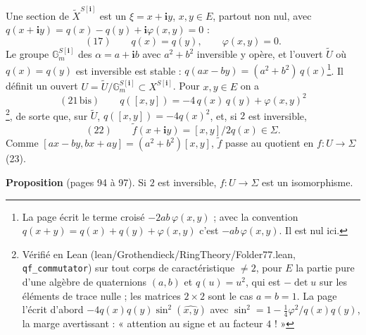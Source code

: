 \documentclass[11pt,a4paper]{article}
\begin{document}
Une section de $\tilde{X}^{S[\mathbf{i}]}$ est un $\xi = x + \mathbf{i}y$, $x, y \in E$,
partout non nul, avec $q(x + \mathbf{i}y) = q(x) - q(y) + \mathbf{i}\varphi(x, y) = 0$ :
\[
  (17) \qquad q(x) = q(y), \qquad \varphi(x, y) = 0 .
\]
Le groupe $\mathbb{G}_m^{S[\mathbf{i}]}$ des $\alpha = a + \mathbf{i}b$ avec $a^2 + b^2$
inversible y opère, et l'ouvert $\tilde{U}$ où $q(x) = q(y)$ est inversible est stable :
$q(ax - by) = (a^2 + b^2)\, q(x)$\footnote{La page écrit le terme croisé $-2ab\,
\varphi(x, y)$ ; avec la convention $q(x + y) = q(x) + q(y) + \varphi(x, y)$ c'est
$-ab\,\varphi(x, y)$. Il est nul ici.}. Il définit un ouvert $U =
\tilde{U}/\mathbb{G}_m^{S[\mathbf{i}]} \subset X^{S[\mathbf{i}]}$. Pour $x, y \in E$ on a
\[
  (21\,\text{bis}) \qquad q([x, y]) = -4\, q(x)\, q(y) + \varphi(x, y)^2
\]
\footnote{Vérifié en Lean (lean/Grothendieck/RingTheory/Folder77.lean,
\texttt{qf\_commutator}) sur tout corps de caractéristique $\neq 2$, pour $E$ la
partie pure d'une algèbre de quaternions $(a, b)$ et $q(u) = u^2$, qui est
$-\det u$ sur les éléments de trace nulle ; les matrices $2 \times 2$ sont le
cas $a = b = 1$. La page
l'écrit d'abord $-4q(x)q(y)\sin^2(\widehat{x, y})$ avec $\sin^2 = 1 - \frac{1}{4}
\varphi^2/q(x)q(y)$, la marge avertissant : « attention au signe et au facteur
$4$ ! »}, de sorte que, sur $\tilde{U}$, $q([x, y]) = -4q(x)^2$, et, si $2$ est
inversible,
\[
  (22) \qquad \tilde{f}(x + \mathbf{i}y) = [x, y]/2q(x) \in \Sigma .
\]
Comme $[ax - by, bx + ay] = (a^2 + b^2)[x, y]$, $\tilde{f}$ passe au quotient en $f : U
\to \Sigma$ (23).

\textbf{Proposition} (pages 94 à 97). Si $2$ est inversible, $f : U \to \Sigma$ est un
isomorphisme.
\end{document}
